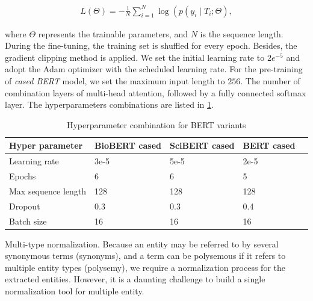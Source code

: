 \begin{align}
    L(\Theta)=-\frac{1}{N} \sum_{i=1}^{N} \log \left(p\left(y_{i} \mid T_{i}; \Theta\right)\right. ,
\end{align}

\hspace*{3.5mm} where $\Theta$ represents the trainable parameters, and $N$ is the sequence length. During the fine-tuning, the training set is shuffled for every epoch. Besides, the gradient clipping method is applied. We set the initial learning rate to $2 e^{-5}$ and adopt the Adam optimizer with the scheduled learning rate. For the pre-training of \textit{cased BERT} model, we set the maximum input length to $256$. The number of combination layers of multi-head attention, followed by a fully connected softmax layer. The hyperparameters combinations are listed in \cref{table:bert_params}. 

\begin{table}
    \centering
    \caption{Hyperparameter combination for BERT variants}
    \label{table:bert_params}
    \begin{tabular}{l|l|l|l|l}
        \hline
        \textbf{Hyper parameter}  & \textbf{BioBERT cased} &
        \textbf{SciBERT cased} & \textbf{BERT cased}\\
        \hline
        Learning rate & 3e-5 & 5e-5 & 2e-5 \\
        Epochs & 6 & 6 & 5 \\
        Max sequence length & 128 & 128 & 128 \\
        Dropout & 0.3 & 0.3 & 0.4 \\
        Batch size & 16 & 16 & 16 \\
        \hline
    \end{tabular}
\end{table}

\hspace*{3.5mm} Multi-type normalization. Because an entity may be referred to by several synonymous terms (synonyms), and a term can be polysemous if it refers to multiple entity types (polysemy), we require a normalization process for the extracted entities. However, it is a daunting challenge to build a single normalization tool for multiple entity. 

